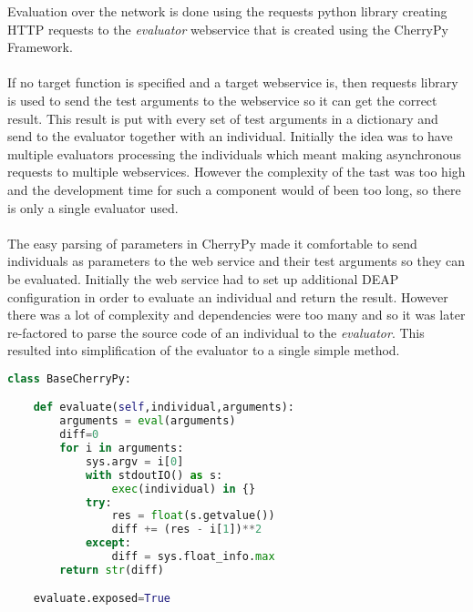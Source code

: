 Evaluation over the network is done using the requests python library creating HTTP requests to the \textit{evaluator} webservice that is created using the CherryPy Framework.
\paragraph{}
If no target function is specified and a target webservice is, then requests library is used to send the test arguments to the webservice so it can get the correct result. This result
is put with every set of test arguments in a dictionary and send to the evaluator together with an individual. Initially the idea was to have multiple evaluators processing the
individuals which meant making asynchronous requests to multiple webservices. However the complexity of the tast was too high and the development time for such a component would
of been too long, so there is only a single evaluator used.
\paragraph{}
The easy parsing of parameters in CherryPy made it comfortable to send individuals as parameters to the web service and their test arguments so they can be evaluated. Initially
the web service had to set up additional DEAP configuration in order to evaluate an individual and return the result. However there was a lot of complexity and dependencies were
too many and so it was later re-factored to parse the source code of an individual to the \textit{evaluator}. This resulted into simplification of the evaluator to 
a single simple method.

\begin{lstlisting}[language=Python,caption={The soruce of the evaluator},label={lst:evaluator}]
class BaseCherryPy:

    def evaluate(self,individual,arguments):
        arguments = eval(arguments)
        diff=0
        for i in arguments:
            sys.argv = i[0]
            with stdoutIO() as s:
                exec(individual) in {}
            try:
                res = float(s.getvalue())
                diff += (res - i[1])**2
            except:
                diff = sys.float_info.max
        return str(diff)

    evaluate.exposed=True
\end{lstlisting}

